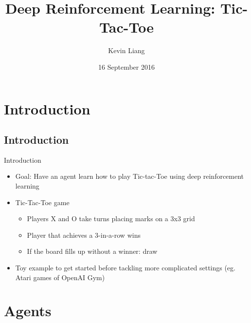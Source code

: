 \documentclass[11pt]{beamer}
\title[CLGP]{Deep Reinforcement Learning: Tic-Tac-Toe }
\author[Liang]{Kevin Liang}
\institute[Duke University]{Duke University}
\date{16 September 2016}
\begin{document}
	
	\begin{frame}
		\maketitle
	\end{frame}
	
	
	
	\section{Introduction}
	
	\subsection{Introduction}
	\begin{frame}{Introduction}
		\begin{itemize}
			
			\item Goal: Have an agent learn how to play Tic-tac-Toe using deep reinforcement learning 
			\item Tic-Tac-Toe game
			\begin{itemize}
				\item Players X and O take turns placing marks on a 3x3 grid
				\item Player that achieves a 3-in-a-row wins
				\item If the board fills up without a winner: draw
			\end{itemize}
			\item Toy example to get started before tackling more complicated settings (eg. Atari games of OpenAI Gym)
			
		\end{itemize}
	\end{frame}
	
	\section{Agents}
	
\end{document}
